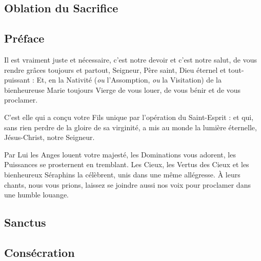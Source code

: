 \subsection*{Oblation du Sacrifice}


\subsection*{%
Préface}
Il est vraiment juste et nécessaire, c’est notre devoir et c’est notre salut, 
de vous rendre grâces toujours et partout, Seigneur, Père saint, Dieu éternel et tout-puissant : Et, en la Nativité (\emph{ou} l'Assomption, \emph{ou} la Visitation) de la bienheureuse Marie toujours Vierge de vous louer, de vous bénir et de vous proclamer. 

C’est elle qui a conçu votre Fils unique par l’opération du Saint-Esprit : et qui, sans rien perdre de la gloire de sa virginité, a mis au monde la lumière éternelle, Jésus-Christ, notre Seigneur.

Par Lui les Anges louent votre majesté, les Dominations vous adorent, les Puissances se prosternent en tremblant. Les Cieux, les Vertus des Cieux et les bienheureux Séraphins la célèbrent, unis dans une même allégresse. À leurs chants, nous vous prions, laissez se joindre aussi nos voix pour proclamer dans une humble louange.

\subsection*{%
Sanctus}

\subsection*{Consécration}

